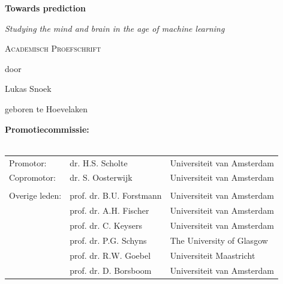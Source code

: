 \documentclass[12pt,american,a4paper,oneside,]{memoir} %
\begin{document}
\clearpage
\thispagestyle{empty}
\vspace*{\drop}
\begin{center}
\Huge\textbf{Towards prediction}\par
\vspace{\baselineskip}
\Large\textit{Studying the mind and brain in the age of machine learning}\par
\vfill %
\large \textsc{Academisch Proefschrift}\par
\vspace{\baselineskip}
\par %
\vspace{\baselineskip}
{\large door}\par
\vspace{\baselineskip}
{\Large Lukas Snoek}\par
\vspace{\baselineskip}
{\large geboren te Hoevelaken}
\end{center}

\clearpage
\thispagestyle{empty}
\noindent\textbf{Promotiecommissie:}\\
\\
\noindent\begin{tabular}{@{}lll}

Promotor:
&  dr. H.S. Scholte & Universiteit van Amsterdam\\

Copromotor:
&  dr. S. Oosterwijk & Universiteit van Amsterdam\\

\\
Overige leden:
&  prof. dr. B.U. Forstmann & Universiteit van Amsterdam\\
&  prof. dr. A.H. Fischer & Universiteit van Amsterdam\\
&  prof. dr. C. Keysers & Universiteit van Amsterdam\\
&  prof. dr. P.G. Schyns & The University of Glasgow\\
&  prof. dr. R.W. Goebel & Universiteit Maastricht\\
&  prof. dr. D. Borsboom & Universiteit van Amsterdam\\
\end{tabular}\\
\end{document}
